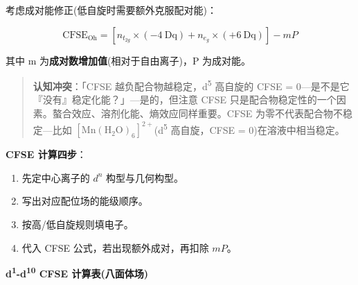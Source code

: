 \documentclass[a4paper,11pt]{ctexart}
\providecommand{\tightlist}{\setlength{\itemsep}{0pt}\setlength{\parskip}{0pt}}
\newcommand{\箭}{\ensuremath{\rightarrow}}
\newcommand{\左箭}{\ensuremath{\leftarrow}}
\newcommand{\上箭}{\ensuremath{\uparrow}}
\newcommand{\下箭}{\ensuremath{\downarrow}}
\newcommand{\衡}{\ensuremath{\rightleftharpoons}}
\newcommand{\双箭}{\ensuremath{\leftrightarrow}}
\newcommand{\约等于}{\ensuremath{\approx}}
\newcommand{\小于等于}{\ensuremath{\leq}}
\newcommand{\大于等于}{\ensuremath{\geq}}
\newcommand{\不等于}{\ensuremath{\neq}}
\newcommand{\西格马}{\ensuremath{\sigma}}
\newcommand{\派}{\ensuremath{\pi}}
\begin{document}
考虑成对能修正(低自旋时需要额外克服配对能)：

\[
\mathrm{CFSE_{Oh}} = [n_{t_{2g}} \times (-4\ \mathrm{Dq}) + n_{e_g} \times (+6\ \mathrm{Dq})] - mP
\]

其中 m 为\textbf{成对数增加值}(相对于自由离子)，P 为成对能。

\begin{quote}
\textbf{认知冲突}：「CFSE 越负配合物越稳定，d\textsuperscript{5} 高自旋的 CFSE = 0---是不是它『没有』稳定化能？」---是的，但注意 CFSE 只是配合物稳定性的一个因素。螯合效应、溶剂化能、熵效应同样重要。CFSE 为零不代表配合物不稳定---比如 \([\mathrm{Mn(H_2O)_6}]^{2+}\)(d\textsuperscript{5} 高自旋，CFSE = 0)在溶液中相当稳定。
\end{quote}

\textbf{CFSE 计算四步}：

\begin{enumerate}
\def\labelenumi{\arabic{enumi}.}
\tightlist
\item
  先定中心离子的 \(d^n\) 构型与几何构型。
\item
  写出对应配位场的能级顺序。
\item
  按高/低自旋规则填电子。
\item
  代入 CFSE 公式，若出现额外成对，再扣除 \(mP\)。
\end{enumerate}

\textbf{d\textsuperscript{1}-d\textsuperscript{10} CFSE 计算表(八面体场)}
\end{document}
